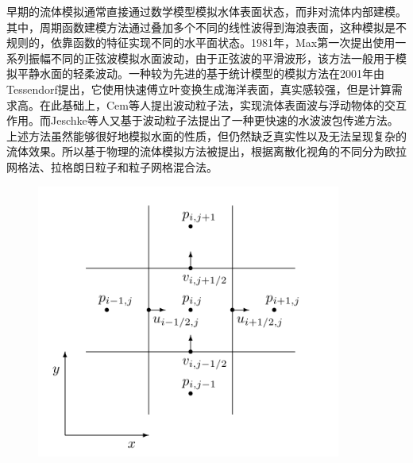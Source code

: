早期的流体模拟通常直接通过数学模型模拟水体表面状态，而非对流体内部建模。其中，周期函数建模方法通过叠加多个不同的线性波得到海浪表面，这种模拟是不规则的，依靠函数的特征实现不同的水平面状态。1981年，Max\cite{max1981vectorized}第一次提出使用一系列振幅不同的正弦波模拟水面波动，由于正弦波的平滑波形，该方法一般用于模拟平静水面的轻柔波动。一种较为先进的基于统计模型的模拟方法在2001年由Tessendorf\cite{tessendorf2001simulating}提出，它使用快速傅立叶变换生成海洋表面，真实感较强，但是计算需求高。在此基础上，Cem等人\cite{yuksel2007wave}提出波动粒子法，实现流体表面波与浮动物体的交互作用。而Jeschke等人\cite{jeschke2015water}又基于波动粒子法提出了一种更快速的水波波包传递方法。
上述方法虽然能够很好地模拟水面的性质，但仍然缺乏真实性以及无法呈现复杂的流体效果。所以基于物理的流体模拟方法被提出，根据离散化视角的不同分为欧拉网格法、拉格朗日粒子和粒子网格混合法。

\begin{figure}[ht]
 \centering
 \includegraphics[width=10cm]{image/mac.png}
 \label{fig:mac}
\end{figure}

